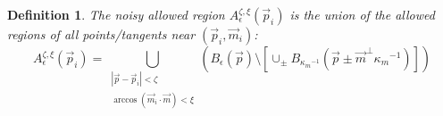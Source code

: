 \documentclass{article}
\newtheorem{definition}[cntr]{Definition}
\numberwithin{cntr}{section}
\numberwithin{equation}{section}
\newcommand{\abs}[1]{\left| #1 \right|}%
\newcommand{\vp}[0]{{\vec{p}}}
\newcommand{\vm}[0]{{\vec{m}}}
\newcommand{\ball}[2]{ { B_{#1}(#2) } }
\newcommand{\curvemax}{{\kappa_{m}}}
\newcommand{\curvemaxi}{{\curvemax^{-1}}}
\newcommand{\pointNoise}{{\zeta}}
\newcommand{\tanNoise}{{\xi}}
\newcommand{\nallowed}[2]{ { A^{\pointNoise, \tanNoise}_{#1}(#2) } }
\begin{document}
\begin{definition}
  \label{def:AllowedRegionNoisy}
The \emph{noisy allowed region} $\nallowed{\epsilon}{\vp_i}$
is the union of the allowed regions of all points/tangents
near $(\vp_i, \vm_i)$:
  \begin{equation}
    \label{eq:allowedRegionNoisy}
    \nallowed{\epsilon}{\vp_i}= \bigcup_{
      \substack{
        \abs{\vp -\vp_{i}} < \pointNoise\\
        \arccos(\vm_{i} \cdot \vm) < \tanNoise
      }
    }
    \left(
      \ball{\epsilon}{\vp} \setminus
\left[ \cup_{\pm} \ball{\curvemaxi}{\vp
\pm \vm^{\perp} \curvemaxi} \right]
    \right)
  \end{equation}
\end{definition}

\vspace{.2in}
\end{document}
